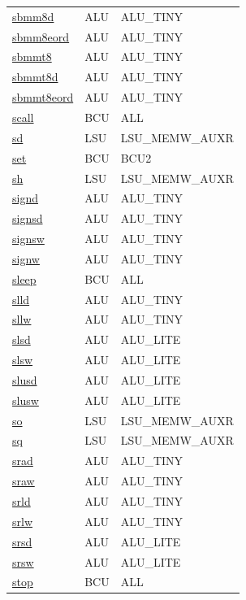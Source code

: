 \begin{small}
\begin{longtable}[l]{l l l}
\hyperlink{lvx.sbmm8d}{sbmm8d} & ALU & ALU\_TINY \\ 
\hyperlink{lvx.sbmm8eord}{sbmm8eord} & ALU & ALU\_TINY \\ 
\hyperlink{lvx.sbmmt8}{sbmmt8} & ALU & ALU\_TINY \\ 
\hyperlink{lvx.sbmmt8d}{sbmmt8d} & ALU & ALU\_TINY \\ 
\hyperlink{lvx.sbmmt8eord}{sbmmt8eord} & ALU & ALU\_TINY \\ 
\hyperlink{lvx.scall}{scall} & BCU & ALL \\ 
\hyperlink{lvx.sd}{sd} & LSU & LSU\_MEMW\_AUXR \\ 
\hyperlink{lvx.set}{set} & BCU & BCU2 \\ 
\hyperlink{lvx.sh}{sh} & LSU & LSU\_MEMW\_AUXR \\ 
\hyperlink{lvx.signd}{signd} & ALU & ALU\_TINY \\ 
\hyperlink{lvx.signsd}{signsd} & ALU & ALU\_TINY \\ 
\hyperlink{lvx.signsw}{signsw} & ALU & ALU\_TINY \\ 
\hyperlink{lvx.signw}{signw} & ALU & ALU\_TINY \\ 
\hyperlink{lvx.sleep}{sleep} & BCU & ALL \\ 
\hyperlink{lvx.slld}{slld} & ALU & ALU\_TINY \\ 
\hyperlink{lvx.sllw}{sllw} & ALU & ALU\_TINY \\ 
\hyperlink{lvx.slsd}{slsd} & ALU & ALU\_LITE \\ 
\hyperlink{lvx.slsw}{slsw} & ALU & ALU\_LITE \\ 
\hyperlink{lvx.slusd}{slusd} & ALU & ALU\_LITE \\ 
\hyperlink{lvx.slusw}{slusw} & ALU & ALU\_LITE \\ 
\hyperlink{lvx.so}{so} & LSU & LSU\_MEMW\_AUXR \\ 
\hyperlink{lvx.sq}{sq} & LSU & LSU\_MEMW\_AUXR \\ 
\hyperlink{lvx.srad}{srad} & ALU & ALU\_TINY \\ 
\hyperlink{lvx.sraw}{sraw} & ALU & ALU\_TINY \\ 
\hyperlink{lvx.srld}{srld} & ALU & ALU\_TINY \\ 
\hyperlink{lvx.srlw}{srlw} & ALU & ALU\_TINY \\ 
\hyperlink{lvx.srsd}{srsd} & ALU & ALU\_LITE \\ 
\hyperlink{lvx.srsw}{srsw} & ALU & ALU\_LITE \\ 
\hyperlink{lvx.stop}{stop} & BCU & ALL \\ 

\end{longtable}
\end{small}
